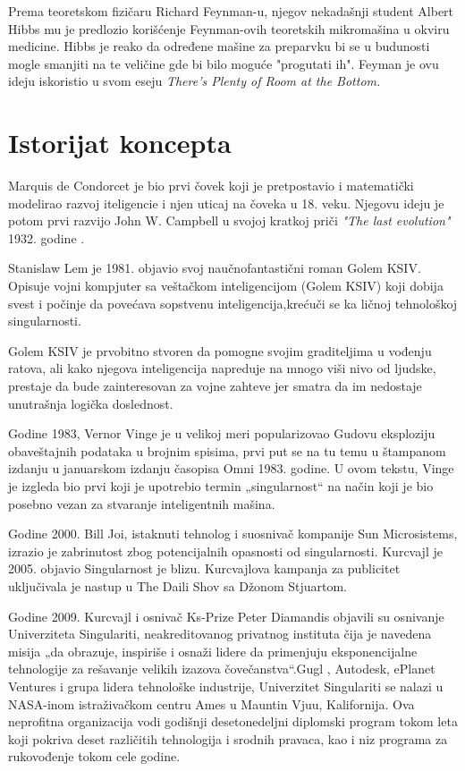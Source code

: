 \documentclass[a4paper]{article}
\begin{document}
  Prema teoretskom fizičaru  Richard Feynman-u, njegov nekadašnji student Albert Hibbs mu je predlozio korišćenje Feynman-ovih teoretskih mikromašina u okviru medicine. Hibbs je reako da određene mašine za preparvku bi se u budunosti mogle smanjiti na te veličine gde bi bilo moguće "progutati ih". Feyman je ovu ideju iskoristio u svom eseju \textit{ There's Plenty of Room at the Bottom.}\cite{refe4}
\section{Istorijat koncepta}
\label{sec:istorijat}

Marquis de Condorcet je bio prvi čovek koji je pretpostavio i matematički modelirao razvoj iteligencie i njen uticaj na čoveka u 18. veku. Njegovu ideju je potom prvi razvijo John W. Campbell u svojoj kratkoj priči\textit{ "The last evolution"} 1932. godine .\cite{refe5}

Stanislaw Lem je 1981. objavio svoj naučnofantastični roman Golem KSIV. Opisuje vojni kompjuter sa veštačkom inteligencijom (Golem KSIV) koji dobija svest i počinje da povećava sopstvenu inteligencija,krećuči se ka ličnoj tehnološkoj singularnosti.\cite{refe6}


Golem KSIV je prvobitno stvoren da pomogne svojim graditeljima u vođenju ratova, ali kako njegova inteligencija napreduje na mnogo viši nivo od ljudske, prestaje da bude zainteresovan za vojne zahteve jer smatra da im nedostaje unutrašnja logička doslednost.

Godine 1983, Vernor Vinge je u velikoj meri popularizovao Gudovu eksploziju obaveštajnih podataka u brojnim spisima, prvi put se na tu temu u štampanom izdanju u januarskom izdanju časopisa Omni 1983. godine. U ovom tekstu, Vinge je izgleda bio prvi koji je upotrebio termin „singularnost“ na način koji je bio posebno vezan za stvaranje inteligentnih mašina.\cite{refe7}

Godine 2000. Bill Joi, istaknuti tehnolog i suosnivač kompanije Sun Microsistems, izrazio je zabrinutost zbog potencijalnih opasnosti od singularnosti. Kurcvajl je 2005. objavio Singularnost je blizu. Kurcvajlova kampanja za publicitet uključivala je nastup u The Daili Shov sa Džonom Stjuartom.

Godine 2009. Kurcvajl i osnivač Ks-Prize Peter Diamandis objavili su osnivanje Univerziteta Singulariti, neakreditovanog privatnog instituta čija je navedena misija „da obrazuje, inspiriše i osnaži lidere da primenjuju eksponencijalne tehnologije za rešavanje velikih izazova čovečanstva“.Gugl , Autodesk, ePlanet Ventures i grupa lidera tehnološke industrije, Univerzitet Singulariti se nalazi u NASA-inom istraživačkom centru Ames u Mauntin Vjuu, Kalifornija. Ova neprofitna organizacija vodi godišnji desetonedeljni diplomski program tokom leta koji pokriva deset različitih tehnologija i srodnih pravaca, kao i niz programa za rukovođenje tokom cele godine.\cite{refe8}
\end{document}
